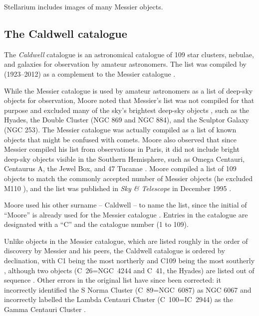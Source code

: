 Stellarium includes images of many Messier objects.

%
%
\subsection{The Caldwell catalogue}
\label{sec:Phenomena:Caldwell}

The \emph{Caldwell} catalogue is an astronomical catalogue of 109 star
clusters, nebulae, and galaxies for observation by amateur
astronomers. The list was compiled by 
(1923--2012) as a complement to the Messier catalogue
\citep{SJOMeara:2003}.

While the Messier catalogue is used by amateur astronomers as a list
of deep-sky objects for observation, Moore noted that Messier's list
was not compiled for that purpose and excluded many of the sky's
brightest deep-sky objects \citep{SJOMeara:2003}, such as the Hyades,
the Double Cluster (NGC 869 and NGC 884), and the Sculptor Galaxy (NGC
253). The Messier catalogue was actually compiled as a list of known
objects that might be confused with comets. Moore also observed that
since Messier compiled his list from observations in Paris, it did not
include bright deep-sky objects visible in the Southern Hemisphere,
such as Omega Centauri, Centaurus A, the Jewel Box, and 47 Tucanae
\citep{SJOMeara:2003}. Moore compiled a list of 109 objects to match
the commonly accepted number of Messier objects (he excluded M110
\citep{Moore:1995}), and the list was published in \emph{Sky \&
  Telescope} in December 1995 \citep{Moore:1995}.

Moore used his other surname -- Caldwell -- to name the list, since
the initial of ``Moore'' is already used for the Messier catalogue
\citep{SJOMeara:2003}. Entries in the catalogue are designated with a
``C'' and the catalogue number (1 to 109).

Unlike objects in the Messier catalogue, which are listed roughly in
the order of discovery by Messier and his peers, the Caldwell
catalogue is ordered by declination, with C1 being the most northerly
and C109 being the most southerly \citep{SJOMeara:2003}, although two
objects (C~26=NGC~4244 and C~41, the Hyades) are listed out of
sequence \citep{SJOMeara:2003}. Other errors in the original list have
since been corrected: it incorrectly identified the S Norma Cluster
(C~89=NGC~6087) as NGC 6067 and incorrectly labelled the Lambda
Centauri Cluster (C~100=IC~2944) as the Gamma Centauri Cluster
\citep{SJOMeara:2003}.

